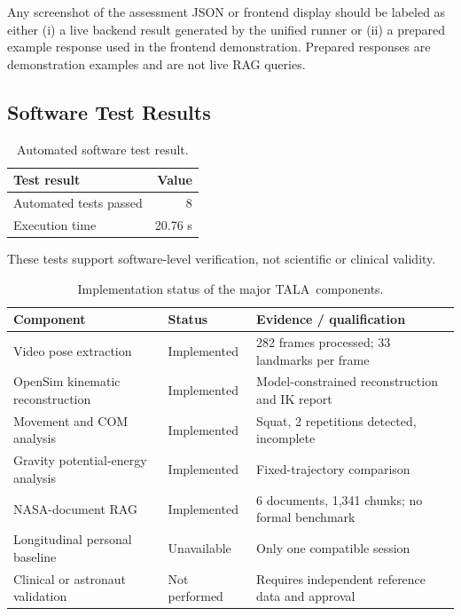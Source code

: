 \documentclass[11pt,a4paper]{article}
\newcommand{\TALA}{\textsc{TALA}}
\begin{document}
Any screenshot of the assessment JSON or frontend display should be labeled as either (i) a live backend result generated by the unified runner or (ii) a prepared example response used in the frontend demonstration. Prepared responses are demonstration examples and are not live RAG queries.

\subsection{Software Test Results}

\begin{table}[H]
\centering
\caption{Automated software test result.}
\label{tab:tests}
\begin{tabular}{lr}
\toprule
\textbf{Test result} & \textbf{Value}\\
\midrule
Automated tests passed & 8\\
Execution time & 20.76 s\\
\bottomrule
\end{tabular}
\end{table}

These tests support software-level verification, not scientific or clinical validity.

\begin{table}[H]
\centering
\caption{Implementation status of the major \TALA\ components.}
\label{tab:status}
\begin{tabularx}{\linewidth}{l l X}
\toprule
\textbf{Component} & \textbf{Status} & \textbf{Evidence / qualification}\\
\midrule
Video pose extraction & Implemented & 282 frames processed; 33 landmarks per frame\\
OpenSim kinematic reconstruction & Implemented & Model-constrained reconstruction and IK report\\
Movement and COM analysis & Implemented & Squat, 2 repetitions detected, incomplete\\
Gravity potential-energy analysis & Implemented & Fixed-trajectory comparison\\
NASA-document RAG & Implemented & 6 documents, 1,341 chunks; no formal benchmark\\
Longitudinal personal baseline & Unavailable & Only one compatible session\\
Clinical or astronaut validation & Not performed & Requires independent reference data and approval\\
\bottomrule
\end{tabularx}
\end{table}
\end{document}
